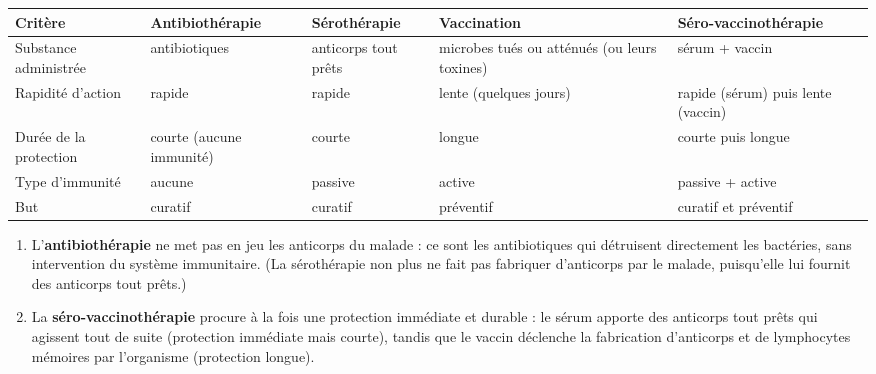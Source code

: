 \documentclass[11pt]{article}
\begin{document}
\begin{corrige}
\begin{center}
\begin{tabularx}{\linewidth}{|l|X|X|X|X|}
\hline
\rowcolor{popblueL} Critère & Antibiothérapie & Sérothérapie & Vaccination & Séro-vaccinothérapie \\
\hline
Substance administrée & antibiotiques & anticorps tout prêts & microbes tués ou atténués (ou leurs toxines) & sérum + vaccin \\
\hline
Rapidité d'action & rapide & rapide & lente (quelques jours) & rapide (sérum) puis lente (vaccin) \\
\hline
Durée de la protection & courte (aucune immunité) & courte & longue & courte puis longue \\
\hline
Type d'immunité & aucune & passive & active & passive + active \\
\hline
But & curatif & curatif & préventif & curatif et préventif \\
\hline
\end{tabularx}
\end{center}
\begin{enumerate}
\item L'\textbf{antibiothérapie} ne met pas en jeu les anticorps du malade : ce sont les antibiotiques qui détruisent directement les bactéries, sans intervention du système immunitaire. (La sérothérapie non plus ne fait pas fabriquer d'anticorps par le malade, puisqu'elle lui fournit des anticorps tout prêts.)
\item La \textbf{séro-vaccinothérapie} procure à la fois une protection immédiate et durable : le sérum apporte des anticorps tout prêts qui agissent tout de suite (protection immédiate mais courte), tandis que le vaccin déclenche la fabrication d'anticorps et de lymphocytes mémoires par l'organisme (protection longue).
\end{enumerate}
\end{corrige}
\end{document}
